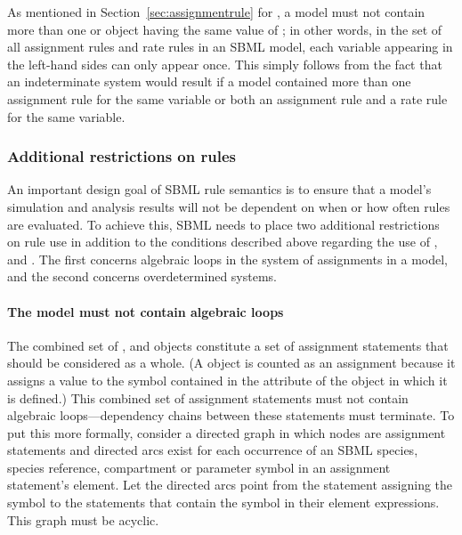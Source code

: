 As mentioned in Section~\ref{sec:assignmentrule} for
\AssignmentRule, a model must not contain more than one \RateRule
or \AssignmentRule object having the same value of
; in other words, in the set of all assignment
rules and rate rules in an SBML model, each variable appearing in
the left-hand sides can only appear once.  This simply follows
from the fact that an indeterminate system would result if a model
contained more than one assignment rule for the same variable or
both an assignment rule and a rate rule for the same variable.


\subsubsection{Additional restrictions on rules}
\label{sec:ruleconstraints}

An important design goal of SBML rule semantics is to ensure that
a model's simulation and analysis results will not be dependent on
when or how often rules are evaluated.  To achieve this, SBML
needs to place two additional restrictions on rule use in addition
to the conditions described above regarding the use of
\AlgebraicRule, \AssignmentRule and \RateRule.  The first concerns
algebraic loops in the system of assignments in a model, and the
second concerns overdetermined systems.


\paragraph{The model must not contain algebraic loops}

The combined set of \InitialAssignment, \AssignmentRule and
\KineticLaw objects constitute a set of assignment statements that
should be considered as a whole.  (A \KineticLaw object is counted
as an assignment because it assigns a value to the symbol
contained in the  attribute of the \Reaction object in which
it is defined.)  This combined set of assignment statements must
not contain algebraic loops---dependency chains between these
statements must terminate.  To put this more formally, consider a
directed graph in which nodes are assignment statements and
directed arcs exist for each occurrence of an SBML species, species reference,
compartment or parameter symbol in an assignment statement's
 element.  Let the directed arcs point from the
statement assigning the symbol to the statements that contain the
symbol in their  element expressions.  This graph must
be acyclic.

